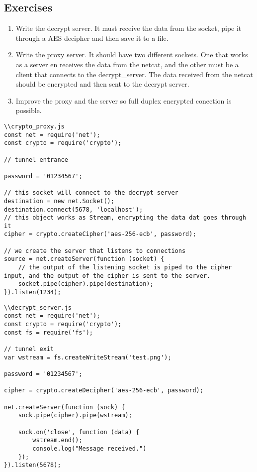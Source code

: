 \subsection{Exercises}
\begin{enumerate}
	\item Write the decrypt server. It must receive the data from the socket, pipe it through a AES decipher and then save it to a file.
	
	\item Write the proxy server. It should have two different sockets. One that works as a server en receives the data from the netcat, and the other must be a client that connects to the decrypt\_server. The data received from the netcat should be encrypted and then sent to the decrypt server.
	
	\item Improve the proxy and the server so full duplex encrypted conection is possible.
\end{enumerate}

\begin{lstlisting}[style=JavaScript]
\\crypto_proxy.js  
const net = require('net');
const crypto = require('crypto');

// tunnel entrance

password = '01234567';

// this socket will connect to the decrypt server
destination = new net.Socket();
destination.connect(5678, 'localhost');
// this object works as Stream, encrypting the data dat goes through it
cipher = crypto.createCipher('aes-256-ecb', password);

// we create the server that listens to connections
source = net.createServer(function (socket) {
    // the output of the listening socket is piped to the cipher input, and the output of the cipher is sent to the server.
    socket.pipe(cipher).pipe(destination);
}).listen(1234);
\end{lstlisting}


\begin{lstlisting}[style=JavaScript]
\\decrypt_server.js
const net = require('net');
const crypto = require('crypto');
const fs = require('fs');

// tunnel exit
var wstream = fs.createWriteStream('test.png');

password = '01234567';

cipher = crypto.createDecipher('aes-256-ecb', password);

net.createServer(function (sock) {
    sock.pipe(cipher).pipe(wstream);

    sock.on('close', function (data) {
        wstream.end();
        console.log("Message received.")
    });
}).listen(5678);
\end{lstlisting}
